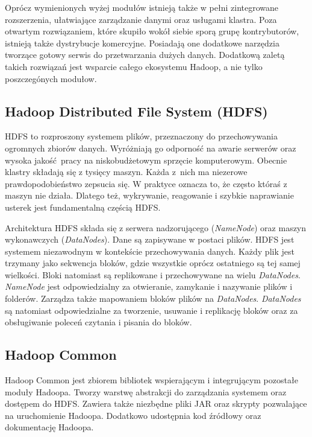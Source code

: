 \documentclass[magisterska]{pracamgr}
\begin{document}
Oprócz wymienionych wyżej modułów istnieją także w pełni zintegrowane rozszerzenia, ułatwiające zarządzanie danymi oraz usługami klastra. Poza otwartym rozwiązaniem, które skupiło wokół siebie sporą grupę kontrybutorów, istnieją także dystrybucje komercyjne. Posiadają one dodatkowe narzędzia tworzące gotowy serwis do przetwarzania dużych danych. Dodatkową zaletą takich rozwiązań jest wsparcie całego ekosystemu Hadoop, a nie tylko poszczegónych modułow.

\subsection{Hadoop Distributed File System (HDFS)} \label{HDFS}

HDFS to rozproszony systemem plików, przeznaczony do przechowywania ogromnych zbiorów danych. Wyróżniają go odporność  na awarie serwerów oraz wysoka jakość pracy na niskobudżetowym sprzęcie komputerowym. Obecnie klastry składają się z tysięcy maszyn. Każda z~nich ma niezerowe prawdopodobieństwo zepsucia się. W praktyce oznacza to, że często któraś z maszyn nie działa. Dlatego też, wykrywanie, reagowanie i szybkie naprawianie usterek jest fundamentalną częścią HDFS.

Architektura HDFS składa się z serwera nadzorującego (\textit{NameNode}) oraz maszyn wykonawczych (\textit{DataNodes}). Dane są zapisywane w postaci plików. HDFS jest systemem niezawodnym w kontekście przechowywania danych. Każdy plik jest trzymany jako sekwencja bloków, gdzie wszystkie oprócz ostatniego są tej samej wielkości. Bloki natomiast są replikowane i przechowywane na wielu \textit{DataNodes}. \textit{NameNode} jest odpowiedzialny za otwieranie, zamykanie i nazywanie plików i folderów. Zarządza także mapowaniem bloków plików na \textit{DataNodes}. \textit{DataNodes} są natomiast odpowiedzialne za tworzenie, usuwanie i replikację bloków oraz za obsługiwanie poleceń czytania i pisania do bloków.

\subsection{Hadoop Common} \label{Hadoop Common}

Hadoop Common jest zbiorem bibliotek wspierającym i integrującym pozostałe moduły Hadoopa. Tworzy warstwę abstrakcji do zarządzania systemem oraz dostępem do HDFS. Zawiera także niezbędne pliki JAR oraz skrypty pozwalające na uruchomienie Hadoopa. Dodatkowo udostępnia kod źródłowy oraz dokumentację Hadoopa.
\end{document}

